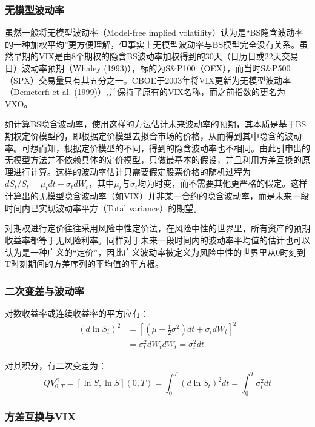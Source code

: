 \documentclass[11pt]{article}
\begin{document}
\subsubsection{无模型波动率}

虽然一般将无模型波动率（Model-free implied volatility）认为是“BS隐含波动率的一种加权平均”更方便理解，但事实上无模型波动率与BS模型完全没有关系。虽然早期的VIX是由8个期权的隐含BS波动率加权得到的30天（日历日或22天交易日）波动率预期（Whaley (1993)），标的为S\&P100（OEX），而当时S\&P500（SPX）交易量只有其五分之一。CBOE于2003年将VIX更新为无模型波动率（Demeterfi et al. (1999)）,并保持了原有的VIX名称，而之前指数的更名为VXO。

如计算BS隐含波动率，使用这样的方法估计未来波动率的预期，其本质是基于BS期权定价模型的，即根据定价模型去拟合市场的价格，从而得到其中隐含的波动率。可想而知，根据定价模型的不同，得到的隐含波动率也不相同。由此引申出的无模型方法并不依赖具体的定价模型，只做最基本的假设，并且利用方差互换的原理进行计算。这样的波动率估计只需要假定股票价格的随机过程为$dS_t/S_t =\mu_t dt + \sigma_t dW_t$，其中$\mu_t$与$\sigma_t$均为时变，而不需要其他更严格的假定。这样计算出的无模型隐含波动率（如VIX）并非某一合约的隐含波动率，而是未来一段时间内已实现波动率平方（Total variance）的期望。

对期权进行定价往往采用风险中性定价法，在风险中性的世界里，所有资产的预期收益率都等于无风险利率。同样对于未来一段时间内的波动率平均值的估计也可以认为是一种广义的“定价”，因此广义波动率被定义为风险中性的世界里从0时刻到T时刻期间的方差序列的平均值的平方根。

\subsubsection*{二次变差与波动率}

对数收益率或连续收益率的平方应有：
\begin{align*}
    ( d\ln S_t )^2 &= \left[ \left(\mu - \frac{1}{2} \sigma^2 \right)dt + \sigma_t dW_t\right]^2 \\
    & = \sigma_t^2 dW_t dW_t = \sigma_t^2 dt
\end{align*}

对其积分，有二次变差为：
\begin{equation*}
        QV_{0,T}^{S} = \left[\ln S, \ln S \right](0,T) = \int_{0}^{T} (d\ln S_t)^2 dt = \int_{0}^{T} \sigma_t^2 dt
\end{equation*}

\subsubsection{方差互换与VIX}
\end{document}
